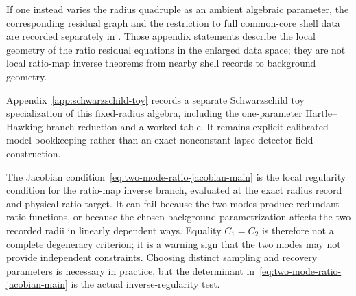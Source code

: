 If one instead varies the radius quadruple as an ambient algebraic parameter,
the corresponding residual graph and the restriction to full common-core shell
data are recorded separately in
. Those appendix statements describe the local geometry of the ratio residual equations in the enlarged data space; they are not local ratio-map inverse theorems from nearby shell records to background geometry.

Appendix~\ref{app:schwarzschild-toy} records a separate Schwarzschild toy
specialization of this fixed-radius algebra, including the one-parameter
Hartle--Hawking branch reduction and a worked table. It remains explicit
calibrated-model bookkeeping rather than an exact nonconstant-lapse
detector-field construction.

\begin{remark}\label{rem:jacobian-main}
The Jacobian condition~\eqref{eq:two-mode-ratio-jacobian-main} is the local regularity condition for the ratio-map inverse branch, evaluated at the exact radius record and physical ratio target. It can fail because the two modes produce redundant ratio functions, or because the chosen background parametrization affects the two recorded radii in linearly dependent ways. Equality $C_1=C_2$ is therefore not a complete degeneracy criterion; it is a warning sign that the two modes may not provide independent constraints. Choosing distinct sampling and recovery parameters is necessary in practice, but the determinant in~\eqref{eq:two-mode-ratio-jacobian-main} is the actual inverse-regularity test.
\end{remark}
